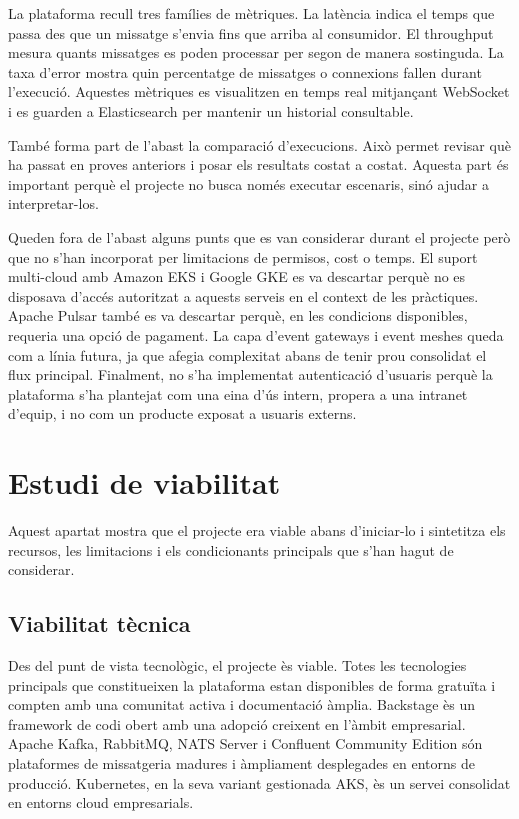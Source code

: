 \documentclass[11pt,a4paper]{article}
\newcommand{\sectionintro}[1]{%
  \vspace{0.25em}%
  #1\par
}
\begin{document}
La plataforma recull tres fam\'ilies de m\`etriques. La lat\`encia indica el temps que passa des que un missatge s'envia fins que arriba al consumidor. El throughput mesura quants missatges es poden processar per segon de manera sostinguda. La taxa d'error mostra quin percentatge de missatges o connexions fallen durant l'execuci\'o. Aquestes m\`etriques es visualitzen en temps real mitjan\c{c}ant WebSocket i es guarden a Elasticsearch per mantenir un historial consultable.

Tamb\'e forma part de l'abast la comparaci\'o d'execucions. Aix\`o permet revisar qu\`e ha passat en proves anteriors i posar els resultats costat a costat. Aquesta part \'es important perqu\`e el projecte no busca nom\'es executar escenaris, sin\'o ajudar a interpretar-los.

Queden fora de l'abast alguns punts que es van considerar durant el projecte per\`o que no s'han incorporat per limitacions de permisos, cost o temps. El suport multi-cloud amb Amazon EKS i Google GKE es va descartar perqu\`e no es disposava d'acc\'es autoritzat a aquests serveis en el context de les pr\`actiques. Apache Pulsar tamb\'e es va descartar perqu\`e, en les condicions disponibles, requeria una opci\'o de pagament. La capa d'event gateways i event meshes queda com a l\'inia futura, ja que afegia complexitat abans de tenir prou consolidat el flux principal. Finalment, no s'ha implementat autenticaci\'o d'usuaris perqu\`e la plataforma s'ha plantejat com una eina d'\'us intern, propera a una intranet d'equip, i no com un producte exposat a usuaris externs.

\section{Estudi de viabilitat}
\sectionintro{Aquest apartat mostra que el projecte era viable abans d'iniciar-lo i sintetitza els recursos, les limitacions i els condicionants principals que s'han hagut de considerar.}

\subsection{Viabilitat t\`ecnica}
Des del punt de vista tecnol\`ogic, el projecte \`es viable. Totes les tecnologies principals que constitueixen la plataforma estan disponibles de forma gratu\"ita i compten amb una comunitat activa i documentaci\'o \`amplia. Backstage \`es un framework de codi obert amb una adopci\'o creixent en l'\`ambit empresarial. Apache Kafka, RabbitMQ, NATS Server i Confluent Community Edition s\'on plataformes de missatgeria madures i \`ampliament desplegades en entorns de producci\'o. Kubernetes, en la seva variant gestionada AKS, \`es un servei consolidat en entorns cloud empresarials.
\end{document}
